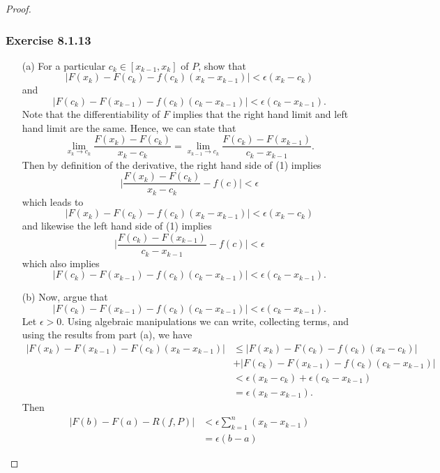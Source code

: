 \begin{proof}
\subsubsection{Exercise 8.1.13} 

\begin{enumerate}
    \item[(a)] For a particular \( c_{k } \in [x_{k-1}, x_{k } ]  \) of \( P  \), show that  
\[  | F(x_{k }) - F(c_{k}) - f(c_{k })(x_{k } - x_{k-1})  | < \epsilon ( x_{k } - c_{k }) \] and 
\[  | F(c_{k}) - F(x_{k-1}) - f(c_{k })(c_{k} - x_{k-1})   | <  \epsilon (c_{k } -  x_{k-1}). \]
Note that the differentiability of \( F \) implies that the right hand limit and left hand limit are the same. Hence, we can state that 
\[ \lim_{ x_{k}  \to c_{k }  }  \frac{ F(x_{k } ) - F(c_{k })  }{ x_{k } - c_{k}  } = \lim_{ x_{k-1}  \to c_{k }  } \frac{ F(c_{k }) - F(x_{k-1}) }{ c_{k } - x_{k-1} }. \tag{1}  \] Then by definition of the derivative, the right hand side of (1) implies
\[  \Big| \frac{ F(x_{k } ) - F(c_{k }) }{ x_{k } - c_{k } }  - f(c)  \Big| < \epsilon  \] which leads to 
\[  | F(x_{k }) - F(c_{k}) - f(c_{k })(x_{k } - x_{k-1})  | < \epsilon ( x_{k } - c_{k }) \] and  likewise the left hand side of (1) implies
\[  \Big| \frac{ F(c_{k } ) - F(x_{k-1}) }{ c_{k} - x_{k-1} } - f(c) \Big| < \epsilon \] which also implies 
\[  | F(c_{k}) - F(x_{k-1}) - f(c_{k })(c_{k} - x_{k-1})   | <  \epsilon (c_{k } -  x_{k-1}). \]
    \item[(b)] Now, argue that 
        \[  | F(c_{k }) - F(x_{k-1}) - f(c_{k } )(c_{k} - x_{k-1}) | < \epsilon (c_{k } - x_{k-1}). \]
        Let \( \epsilon > 0  \). Using algebraic manipulations we can write, collecting terms, and using the results from part (a), we have
        \begin{align*}
            | F(x_{k}) - F(x_{k-1}) -F(c_{k})(x_{k } - x_{k-1}) | &\leq | F(x_{k}) - F(c_{k } ) - f(c_{k}  ) (x_{k } - c_{k }) | \\&+ | F(c_{k})  - F(x_{k-1}) - f(c_{k }) (c_{k} - x_{k-1}) |   \\
                                                                  &< \epsilon (x_{k } - c_{k }) + \epsilon(c_{k } - x_{k-1}) \\
                                                                  &= \epsilon(x_{k } - x_{k-1}).
        \end{align*}
        Then 
        \begin{align*}
            | F(b) - F(a) - R(f,P)   | &<  \epsilon  \sum_{ k=1 }^{ n } ( x_{k } - x_{k-1}) \\
                                       &=\epsilon (b -a )
        \end{align*}
\end{enumerate}
\end{proof}

